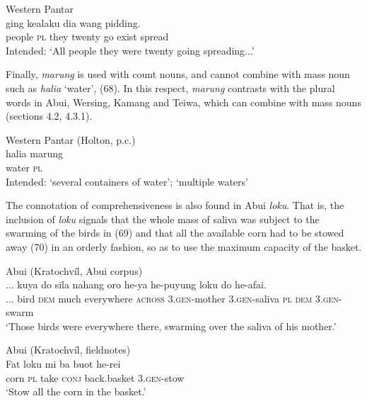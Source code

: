 \ea%
\label{ex:67}
Western Pantar \citep{Holton2012}\\
 ging kealaku dia wang pidding. \\
    people \textsc{pl} they twenty go exist spread \\
 \glt Intended: `All people they were twenty going spreading...'
\z






Finally, \textit{marung} is used with count nouns, and cannot combine with mass noun such as \textit{halia} `water', (68). In this respect, \textit{marung} contrasts with the plural words in Abui, Wersing, Kamang and Teiwa, which can combine with mass nouns (sections 4.2,  4.3.1).


\ea%
\label{ex:68}
Western Pantar (Holton, p.c.)\\
\gll  *halia marung \\
   water \textsc{pl}  \\
 Intended: `several containers of water';  `multiple waters'
\z






The connotation of comprehensiveness is also found in Abui \textit{loku}. That is, the inclusion of \textit{loku} signals that the whole mass of saliva was subject to the swarming of the birds in (69) and that all the available corn had to be stowed away (70) in an orderly fashion, so as to use the maximum capacity of the basket.


\ea%
\label{ex:69}
Abui (Kratochv\'il, Abui corpus)\\
\gll  ... {kuya} do sila nahang oro  he-ya he-puyung loku do he-afai. \\
   ...  bird \textsc{dem} much everywhere \textsc{across}   \textsc{3.gen}-mother \textsc{3.gen-}saliva \textsc{pl} \textsc{dem} \textsc{3.gen-}swarm \\
\glt `Those birds were everywhere there, swarming over the saliva of his mother.'
\z













\ea%
\label{ex:70}
Abui (Kratochv\'il, fieldnotes)\\
\gll  Fat loku mi ba buot he-rei \\
    corn \textsc{pl} take \textsc{conj} back.basket \textsc{3.gen-}stow \\
\glt `Stow all the corn in the basket.'
\z







